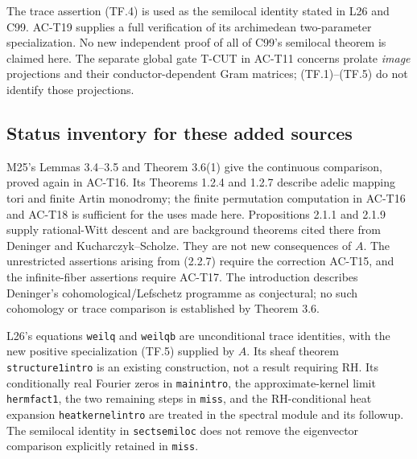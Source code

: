 The trace assertion (TF.4) is used as the semilocal identity
stated in L26 and C99.  AC-T19 supplies a full verification
of its archimedean two-parameter specialization.  No
new independent proof of all of C99's semilocal theorem is
claimed here.  The separate global gate T-CUT in AC-T11
concerns prolate \emph{image} projections and their
conductor-dependent Gram matrices; (TF.1)--(TF.5) do not
identify those projections.

\subsection{Status inventory for these added sources}

M25's Lemmas 3.4--3.5 and Theorem 3.6(1) give the continuous
comparison, proved again in AC-T16.
Its Theorems 1.2.4 and 1.2.7 describe adelic mapping tori and
finite Artin monodromy; the finite permutation computation
in AC-T16 and AC-T18 is sufficient for the uses made here.
Propositions 2.1.1 and 2.1.9 supply rational-Witt descent and
are background theorems cited there from Deninger and
Kucharczyk--Scholze.  They are not new consequences of \(A\).
The unrestricted assertions arising from (2.2.7) require the
correction AC-T15, and the infinite-fiber assertions require
AC-T17.  The introduction describes Deninger's
cohomological/Lefschetz programme as conjectural; no such
cohomology or trace comparison is established by Theorem 3.6.

L26's equations \texttt{weilq} and \texttt{weilqb} are
unconditional trace identities, with the new positive
specialization (TF.5) supplied by \(A\).
Its sheaf theorem \texttt{structure1intro} is an existing
construction, not a result requiring RH.
Its conditionally real Fourier zeros in \texttt{mainintro},
the approximate-kernel limit \texttt{hermfact1}, the two
remaining steps in \texttt{miss}, and the RH-conditional heat
expansion \texttt{heatkernelintro} are treated in the spectral
module and its followup.  The semilocal identity in
\texttt{sectsemiloc} does not remove the eigenvector comparison
explicitly retained in \texttt{miss}.

